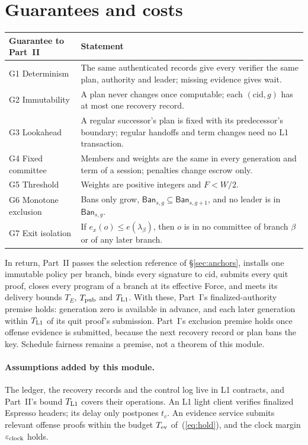 \documentclass[11pt,a4paper]{article}
\newcommand{\Ban}{\mathsf{Ban}}
\newcommand{\cid}{\mathrm{cid}}
\begin{document}
\section{Guarantees and costs}
\label{sec:guarantees}
\begin{tabularx}{\linewidth}{@{}>{\raggedright\arraybackslash}p{.24\linewidth}Y@{}}\toprule
Guarantee to Part~II & Statement\\\midrule
G1 Determinism & The same authenticated records give every verifier the
same plan, authority and leader; missing evidence gives wait.\\
G2 Immutability & A plan never changes once computable; each
$(\cid,g)$ has at most one recovery record.\\
G3 Lookahead & A regular successor's plan is fixed with its predecessor's
boundary; regular handoffs and term changes need no L1 transaction.\\
G4 Fixed committee & Members and weights are the same in every generation
and term of a session; penalties change escrow only.\\
G5 Threshold & Weights are positive integers and $F<W/2$.\\
G6 Monotone exclusion & Bans only grow, $\Ban_{s,g}\subseteq\Ban_{s,g+1}$,
and no leader is in $\Ban_{s,g}$.\\
G7 Exit isolation & If $e_x(o)\le e(\lambda_\beta)$, then $o$ is in no
committee of branch $\beta$ or of any later branch.\\\bottomrule
\end{tabularx}

In return, Part~II passes the selection reference of \S\ref{sec:anchors},
installs one immutable policy per branch, binds every signature to
$\cid$, submits every quit proof, closes every program of a branch at its
effective Force, and meets its delivery bounds $T_E$, $T_{\rm pub}$ and
$T_{\rm L1}$. With these, Part~I's finalized-authority premise holds:
generation zero is available in advance, and each later generation within
$T_{\rm L1}$ of its quit proof's submission. Part~I's exclusion premise
holds once offense evidence is submitted, because the next recovery record
or plan bans the key. Schedule fairness remains a premise, not a theorem
of this module.

\paragraph{Assumptions added by this module.}
The ledger, the recovery records and the control log live in L1
contracts, and Part~II's bound $T_{\rm L1}$ covers their operations. An
L1 light client verifies finalized Espresso headers; its delay only
postpones $t_c$. An evidence service submits relevant offense proofs
within the budget $T_{\rm ev}$ of~(\ref{eq:hold}), and the clock margin
$\varepsilon_{\rm clock}$ holds.
\end{document}
